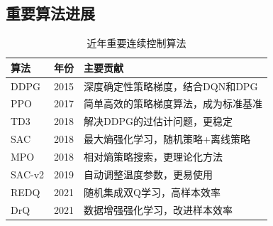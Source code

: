 \subsection{重要算法进展}

\begin{table}[H]
\centering
\caption{近年重要连续控制算法}
\begin{tabular}{p{}p{}p{}}
\toprule
\textbf{算法} & \textbf{年份} & \textbf{主要贡献} \\
\midrule
DDPG & 2015 & 深度确定性策略梯度，结合DQN和DPG \\
PPO & 2017 & 简单高效的策略梯度算法，成为标准基准 \\
TD3 & 2018 & 解决DDPG的过估计问题，更稳定 \\
SAC & 2018 & 最大熵强化学习，随机策略+离线策略 \\
MPO & 2018 & 相对熵策略搜索，更理论化方法 \\
SAC-v2 & 2019 & 自动调整温度参数，更易使用 \\
REDQ & 2021 & 随机集成双Q学习，高样本效率 \\
DrQ & 2021 & 数据增强强化学习，改进样本效率 \\
\bottomrule
\end{tabular}
\end{table}